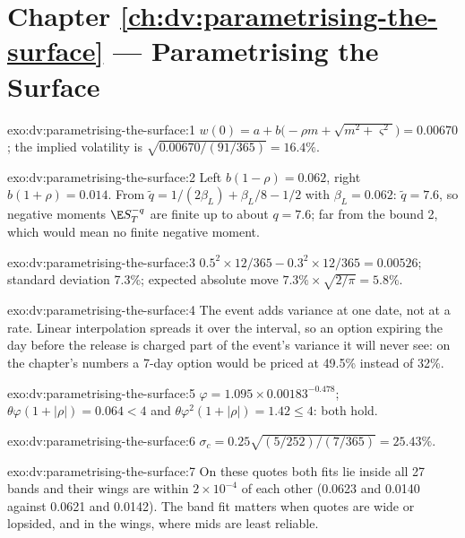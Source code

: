 \section*{Chapter \ref{ch:dv:parametrising-the-surface} --- Parametrising the Surface}

\begin{solution}{exo:dv:parametrising-the-surface:1}
$w(0)=a+b\bigl(-\rho m+\sqrt{m^2+\varsigma^2}\bigr)=0.00670$; the implied volatility is
$\sqrt{0.00670/(91/365)}=16.4\%$.
\end{solution}

\begin{solution}{exo:dv:parametrising-the-surface:2}
Left $b(1-\rho)=0.062$, right $b(1+\rho)=0.014$. From $\tilde q=1/(2\beta_L)+\beta_L/8-1/2$ with
$\beta_L=0.062$: $\tilde q=7.6$, so negative moments $\E S_T^{-q}$ are finite up to about $q=7.6$; far
from the bound 2, which would mean no finite negative moment.
\end{solution}

\begin{solution}{exo:dv:parametrising-the-surface:3}
$0.5^2\times12/365-0.3^2\times12/365=0.00526$; standard deviation 7.3\%; expected absolute move
$7.3\%\times\sqrt{2/\pi}=5.8\%$.
\end{solution}

\begin{solution}{exo:dv:parametrising-the-surface:4}
The event adds variance at one date, not at a rate. Linear interpolation spreads it over the interval,
so an option expiring the day before the release is charged part of the event's variance it will never
see: on the chapter's numbers a 7-day option would be priced at 49.5\% instead of 32\%.
\end{solution}

\begin{solution}{exo:dv:parametrising-the-surface:5}
$\varphi=1.095\times0.00183^{-0.478}$; $\theta\varphi(1+|\rho|)=0.064<4$ and
$\theta\varphi^2(1+|\rho|)=1.42\le4$: both hold.
\end{solution}

\begin{solution}{exo:dv:parametrising-the-surface:6}
$\sigma_c=0.25\sqrt{(5/252)/(7/365)}=25.43\%$.
\end{solution}

\begin{solution}{exo:dv:parametrising-the-surface:7}
On these quotes both fits lie inside all 27 bands and their wings are within $2\times10^{-4}$ of each
other (0.0623 and 0.0140 against 0.0621 and 0.0142). The band fit matters when quotes are wide or
lopsided, and in the wings, where mids are least reliable.
\end{solution}


